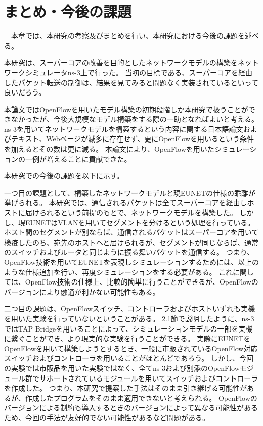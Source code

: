 \chapter{まとめ・今後の課題}

　本章では、本研究の考察及びまとめを行い、本研究における今後の課題を述べる。

本研究は、スーパーコアの改善を目的としたネットワークモデルの構築をネットワークシミュレータns-3上で行った。
当初の目標である、スーパーコアを経由したパケット転送の制御は、結果を見てみると問題なく実装されているといって良いだろう。

本論文ではOpenFlowを用いたモデル構築の初期段階しか本研究で扱うことができなかったが、今後大規模なモデル構築をする際の一助となればよいと考える。
ns-3を用いてネットワークモデルを構築するという内容に関する日本語論文およびテキスト、Webページが滅多に存在せず、更にOpenFlowを用いるという条件を加えるとその数は更に減る。
本論文により、OpenFlowを用いたシミュレーションの一例が増えることに貢献できた。

本研究での今後の課題を以下に示す。

一つ目の課題として、構築したネットワークモデルと現EUNETの仕様の乖離が挙げられる。
本研究では、通信されるパケットは全てスーパーコアを経由しホストに届けられるという前提のもとで、ネットワークモデルを構築した。
しかし、現EUNETはVLANを用いてセグメントを分けるという処理を行っている。
ホスト間のセグメントが別ならば、通信されるパケットはスーパーコアを用いて検疫したのち、宛先のホストへと届けられるが、セグメントが同じならば、通常のスイッチおよびルータと同じように振る舞いパケットを通信する。
つまり、OpenFlow技術を用いてEUNETを表現しシミュレーションするためには、以上のような仕様追加を行い、再度シミュレーションをする必要がある。
これに関しては、OpenFlow技術の仕様上、比較的簡単に行うことができるが、OpenFlowのバージョンにより融通が利かない可能性もある。

二つ目の課題は、OpenFlowスイッチ、コントローラおよびホストいずれも実機を用いた実験を行っていないということがある。
2.1節で説明したように、ns-3ではTAP Bridgeを用いることによって、シミュレーションモデルの一部を実機に繋ぐことができ、より現実的な実験を行うことができる。
実際にEUNETをOpenFlowを用いて構築しようとするとき、一般に市販されているOpenFlow対応スイッチおよびコントローラを用いることがほとんどであろう。
しかし、今回の実験では市販品を用いた実験ではなく、全てns-3および別添のOpenFlowモジュール群でサポートされているモジュールを用いてスイッチおよびコントローラを作成した。
つまり、本研究で提案した手法はそのまま引き継げる可能性があるが、作成したプログラムをそのまま適用できないと考えられる。
OpenFlowのバージョンによる制約も導入するときのバージョンによって異なる可能性があるため、今回の手法が友好的でない可能性があるなど問題がある。